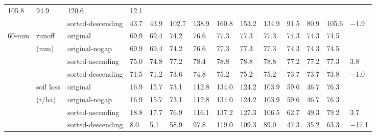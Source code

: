 \begin{table}
\begin{tabular}{llllllllllllll}
105.8 & 94.9 & 120.6 & 12.1 \\
 &  & sorted-descending & 43.7 &  43.9 &  102.7 & 138.9 & 160.8 & 153.2 & 134.9
& 91.5 &  80.9 &  105.6 &  $-$1.9\\
\midrule
60-min & runoff & original & 69.9 & 69.4 & 74.2 & 76.6 & 77.3 & 77.3 & 77.3 &
74.3 & 74.3 & 74.5 &  \\
 & (mm) & original-nogap &  69.9 &  69.4 &  74.2 &  76.6 &  77.3 &  77.3 &  77.3
& 74.3 &  74.3 &  74.5 & \\
 &  & sorted-ascending & 75.0 & 74.8 & 77.2 & 78.4 & 78.8 & 78.8 & 78.8 & 77.2 &
77.2 & 77.3 & 3.8 \\
 &  & sorted-descending & 71.5 &  71.2 &  73.6 &  74.8 &  75.2 &  75.2 &  75.2 &
73.7 &  73.7 &  73.8 &  $-$1.0 \\
 & soil loss & original & 16.9 & 15.7 & 73.1 & 112.8 & 134.0 & 124.2 & 103.9 &
59.6 & 46.7 & 76.3 &  \\
 & (t/ha) & original-nogap &  16.9 &  15.7 &  73.1 &  112.8 & 134.0 & 124.2 &
103.9 & 59.6 &  46.7 &  76.3 & \\
 &  & sorted-ascending & 18.8 & 17.7 & 76.9 & 116.1 & 137.2 & 127.3 & 106.5 &
62.7 & 49.3 & 79.2 & 3.7 \\
 &  & sorted-descending & 8.0 & 5.1 & 58.9 &  97.8 &  119.0 & 109.3 & 89.0 &
47.3 &  35.2 &  63.3 &  $-$17.1 \\
\bottomrule
    \end{tabular}
\end{table}

